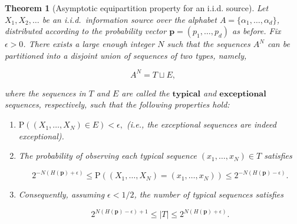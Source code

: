\documentclass[11pt]{report}
\theoremstyle{plain}
\newtheorem{thm}{Theorem}[chapter]
\theoremstyle{definition}
\begin{document}
\begin{thm}[Asymptotic equipartition property for an i.i.d. source]
Let $X_1,X_2,\ldots$ be an i.i.d.\ information source over the alphabet $A=\{\alpha_1,\ldots,\alpha_d\}$, distributed according to the probability vector $\mathbf{p}=(p_1,\ldots,p_d)$ as before. Fix $\epsilon>0$. There exists a large enough integer $N$ such that the sequences $A^N$ can be partitioned into a disjoint union of sequences of two types, namely,

\[
A^N = T \sqcup E,
\]

where the sequences in $T$ and $E$ are called the $\textbf{typical}$ and $\textbf{exceptional}$ sequences, respectively, such that the following properties hold:

\begin{enumerate}[label=\arabic*.]
\item $\mathrm{P}((X_1,\ldots,X_N) \in E) < \epsilon,$ (i.e., the exceptional sequences are indeed exceptional).
\item The probability of observing each typical sequence $(x_1,\ldots,x_N)\in T$ satisfies

\begin{equation*} \tag{26}\label{eq:aep-prob-bound}
2^{-N\left(H(\mathbf{p}) + \epsilon\right)} \le
\mathrm{P}((X_1,\ldots,X_N)=(x_1,\ldots,x_N)) \le
2^{-N\left(H(\mathbf{p}) - \epsilon\right)}.
\end{equation*}
\item Consequently, assuming $\epsilon<1/2$, the number of typical sequences satisfies

\begin{equation*} \tag{27}\label{eq:aep-numtypical}
2^{N (H(\mathbf{p})-\epsilon)+1} \le |T| \le 2^{N (H(\mathbf{p})+\epsilon)}.
\end{equation*}
\end{enumerate}

\end{thm}
\end{document}
